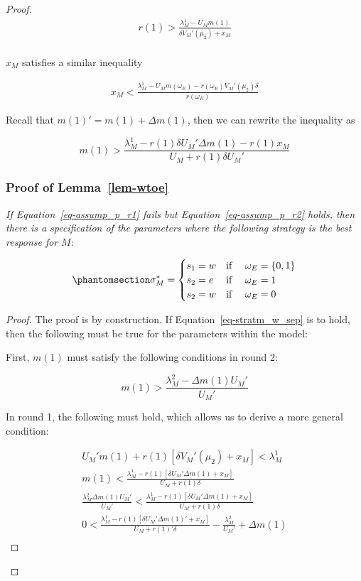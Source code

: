 \documentclass[
  12pt,
]{article}
\theoremstyle{plain}
\theoremstyle{plain}
\theoremstyle{remark}
\begin{document}
\begin{proof}
\[
\begin{aligned}
r(1) > \frac{\lambda_M^1- U_M m(1)}{\delta V_M'(\mu_2) + x_M}\\
\end{aligned}
\]

\(x_M\) satisfies a similar inequality

\[
\begin{aligned}
x_M < \frac{\lambda_M^1- U_M m(\omega_E) - r(\omega_E) V_M'(\mu_2) \delta}{r(\omega_E)}
\end{aligned}
\]

Recall that \(m(1)' = m(1) + \Delta m(1)\), then we can rewrite the
inequality as

\[
m(1) > \frac{\lambda_M^1- r(1) \delta U_M' \Delta m(1) - r(1) x_M}{U_M + r(1) \delta U_M'}
\]

\subsubsection{\texorpdfstring{Proof of
Lemma~\ref{lem-wtoe}}{Proof of Lemma~}}\label{proof-of-lem-wtoe}

\emph{If Equation~\ref{eq-assump_p_r1} fails but
Equation~\ref{eq-assump_p_r2} holds, then there is a specification of
the parameters where the following strategy is the best response for}
\(M\):

\begin{equation}\phantomsection\label{eq-stratm_w_sep}{
\sigma^{*}_M = 
\begin{cases}
s_1 = w  & \text{if } \quad \omega_E = \{0, 1\}\\
s_2 = e  & \text{if } \quad \omega_E = 1\\
s_2 = w  & \text{if } \quad \omega_E = 0\\
\end{cases}
}\end{equation}

\begin{proof}
The proof is by construction. If Equation~\ref{eq-stratm_w_sep} is to
hold, then the following must be true for the parameters within the
model:

First, \(m(1)\) must satisfy the following conditions in round 2:

\[
m(1) > \frac{\lambda_M^2- \Delta m(1) U_M'}{U_M'}
\]

In round 1, the following must hold, which allows us to derive a more
general condition:

\[
\begin{aligned}
U_M' m(1) + r(1)[\delta V_M'(\mu_2) + x_M] < \lambda_M^1\\
m(1) < \frac{\lambda_M^1 - r(1)[\delta U_M' \Delta m(1) + x_M]}{U_M + r(1) \delta} \\
\frac{\lambda_M^2 \Delta m(1) U_M'}{U_M'} <  \frac{\lambda_M^1 - r(1)[\delta U_M' \Delta m(1) + x_M]}{U_M + r(1) \delta}\\
 0<\frac{\lambda_M^1 - r(1)[\delta U_M' \Delta m(1)' + x_M]}{U_M + r(1)' \delta} - \frac{\lambda_M^2}{U_M'} + \Delta m(1) \\
\end{aligned}
\]


\end{proof}
\end{proof}
\end{document}

